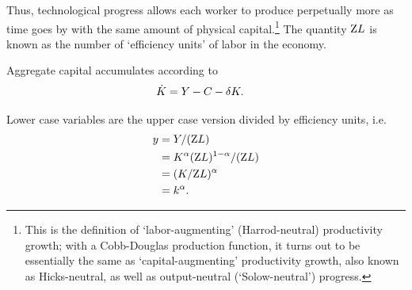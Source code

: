 \documentclass{handout}
\begin{document}
Thus, technological progress allows each worker to
produce perpetually more  as time goes by with the same amount of 
physical capital.\footnote{This is the definition of `labor-augmenting' (Harrod-neutral) 
  productivity growth; with a Cobb-Douglas production function, it turns out to be essentially the same as `capital-augmenting' productivity growth, also known as Hicks-neutral, as well as output-neutral (`Solow-neutral') progress.}  The quantity $\mathrm{Z} L$ is known as the number of `efficiency 
units' of labor in the economy.

Aggregate capital accumulates according to
\begin{equation}\begin{gathered}\begin{aligned}
  \dot{{K}} & =  {Y} - C - \delta K \label{eq:Kdotlevel}.
\end{aligned}\end{gathered}\end{equation}

Lower case variables are the upper case version divided by efficiency units, i.e.
\begin{equation}\begin{gathered}\begin{aligned}
  {y} & =  {Y}/(\mathrm{Z} L)  \\
       & =  {K}^{\alpha}(\mathrm{Z} L)^{1-\alpha}/(\mathrm{Z} L)  \\
       & =  ({K}/\mathrm{Z} L)^{\alpha}
  \\   & =  {k}^{\alpha}    .
\end{aligned}\end{gathered}\end{equation}
\end{document}
